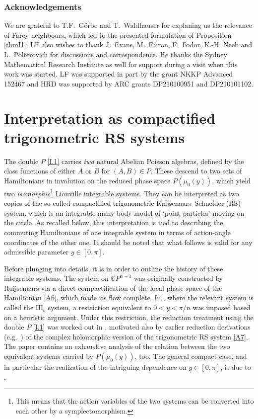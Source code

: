 \documentclass[a4paper,11pt,reqno]{amsart}
\theoremstyle{definition}
\numberwithin{equation}{section}
\def\bC{{\mathbb C}}                        %
\begin{document}
\medskip

\subsubsection*{Acknowledgements}
 We are grateful to
 T.F.~G\"orbe and T.~Waldhauser for explaning us the relevance of Farey neighbours, which led to the
 presented formulation of Proposition \ref{thmI1}.
LF also wishes to thank J.~Evans, M.~Fairon, F.~Fodor, K.-H. Neeb and L.~Polterovich
for discussions and correspondence.
He thanks the Sydney Mathematical Research Institute  as well for support
during a visit when this work was started.
LF was supported in part  by the
grant NKKP Advanced 152467 and
HRD was supported by ARC grants DP210100951 and DP210101102.

\medskip

\appendix
\section{Interpretation as compactified trigonometric RS systems}\label{AppA}

The double $P$ \eqref{I.1} carries \emph{two} natural Abelian Poisson algebras,
defined by the class functions of either $A$ or $B$ for $(A,B) \in P$.
These descend to two  sets of Hamiltonians in involution  on the reduced phase space $P(\mu_0(y))$, which
yield two \emph{isomorphic}\footnote{This  means that the
action variables of the two systems can be converted into each other by a symplectomorphism.}
Liouville integrable systems.
They can be interpreted as two copies of the so-called compactified trigonometric Ruijsenaars--Schneider (RS) system,
which is an integrable many-body model of `point particles' moving on the circle.
As recalled below, this interpretation is tied to describing the commuting Hamiltonians of one integrable system in terms of  action-angle coordinates
of the other one.
It should be noted that what follows is valid for any admissible parameter $y\in [0,\pi]$.


Before plunging into details, it is in order to outline the history of these integrable systems.
The system on ${\bC}P^{n-1}$ was originally constructed by Ruijsenaars \cite{RIMS95} via a direct compactification
of the local phase space of the Hamiltonian \eqref{A6}, which made its flow complete.
In \cite{RIMS95},  where the relevant system is called the $\mathrm{III}_b$ system,
a restriction equivalent to $0<y < \pi/n$ was imposed based on a heuristic argument.
Under this restriction, the reduction treatment using the double $P$ \eqref{I.1} was worked out in \cite{FKlim}, motivated also
by earlier reduction derivations (e.g.~\cite{FR}) of the complex holomorphic version of the trigonometric
RS system  \eqref{A7}.
The paper \cite{FKlim} contains an exhaustive analysis of the relation between the two equivalent systems carried by $P(\mu_0(y))$, too.
The general compact case, and in particular the realization of the intriguing dependence on $y\in [0,\pi]$, is due to \cite{FK}.
\end{document}
